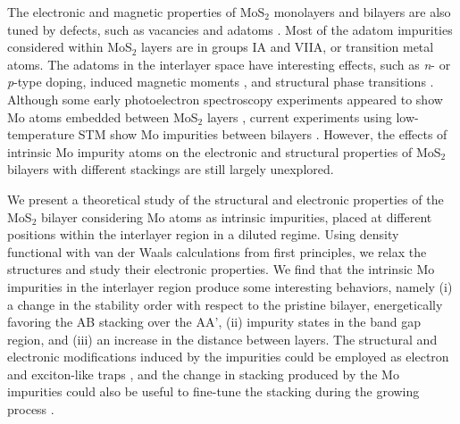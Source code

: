 \documentclass[pra,twocolumn,preprintnumbers,amsmath,amssymb]{revtex4}
\begin{document}
The electronic and magnetic properties of MoS$_{2}$ monolayers and bilayers are also tuned by defects, such as vacancies and adatoms \cite{chang2014atomistic,huang2013density,wang2015electronic}. Most of the adatom impurities considered within MoS$_{2}$ layers are in groups  IA and VIIA, or transition metal atoms. The adatoms in the interlayer space have interesting effects, such as \textit{n}- or \textit{p}-type doping, induced magnetic moments \cite{wang2014first,he2010magnetic,lu2014electronic}, and structural phase transitions \cite{pandey2016phase}.
Although some early photoelectron spectroscopy experiments appeared to show Mo atoms embedded between MoS$_{2}$ layers \cite{fives1992photoelectron},
current experiments using low-temperature STM show Mo impurities between bilayers \cite{wan2013incorporating}.
However, the effects of intrinsic Mo impurity atoms on the electronic and structural properties of MoS$_{2}$ bilayers with different stackings are still largely unexplored.

We present a theoretical study of the structural and electronic properties of the MoS$_{2}$ bilayer considering Mo atoms as intrinsic impurities, placed at different positions within the interlayer region in a diluted regime. Using density functional with van der Waals  calculations from first principles, we relax the structures and study their electronic properties. We find that the intrinsic Mo impurities in the interlayer region produce some interesting behaviors, namely (i) a change in the stability order with respect to the pristine bilayer, energetically favoring the AB stacking over the AA', (ii) impurity states in the band gap region, and (iii) an increase in the distance between layers.
The structural and electronic modifications induced by the impurities could be employed as electron and exciton-like traps \cite{he2013experimental,castellanos2013local}, and the change in stacking produced by the Mo impurities could also be useful to fine-tune the stacking during the growing process \cite{liu2014evolution,PhysRevB.93.041420}.
\end{document}
